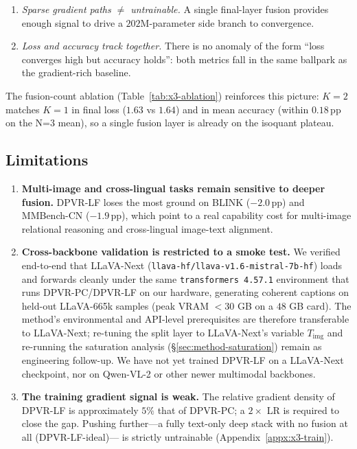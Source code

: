 \documentclass[a4paper,fleqn,review]{cas-sc}
\newcommand{\dpvrlf}{DPVR-LF}
\newcommand{\dpvrpc}{DPVR-PC}
\newcommand{\dpvrlfideal}{DPVR-LF-ideal}
\begin{document}
\begin{enumerate}
\item \emph{Sparse gradient paths $\neq$ untrainable.} A single
final-layer fusion provides enough signal to drive a $202$M-parameter
side branch to convergence.
\item \emph{Loss and accuracy track together.} There is no anomaly
of the form ``loss converges high but accuracy holds'': both
metrics fall in the same ballpark as the gradient-rich baseline.
\end{enumerate}

The fusion-count ablation (Table~\ref{tab:x3-ablation}) reinforces
this picture: $K = 2$ matches $K = 1$ in final loss ($1.63$ vs
$1.64$) and in mean accuracy (within $0.18$\,pp on the N=3 mean),
so a single fusion layer is already on the isoquant plateau.

\subsection{Limitations}\label{sec:discuss-limit}

\begin{enumerate}
\item \textbf{Multi-image and cross-lingual tasks remain sensitive
to deeper fusion.} \dpvrlf{} loses the most ground on BLINK
($-2.0$\,pp) and MMBench-CN ($-1.9$\,pp), which point to a real
capability cost for multi-image relational reasoning and
cross-lingual image-text alignment.

\item \textbf{Cross-backbone validation is restricted to a smoke
test.} We verified end-to-end that LLaVA-Next
(\texttt{llava-hf/llava-v1.6-mistral-7b-hf}) loads and forwards
cleanly under the same \texttt{transformers 4.57.1} environment that
runs \dpvrpc{}/\dpvrlf{} on our hardware, generating coherent
captions on held-out LLaVA-665k samples (peak VRAM
$< 30$ GB on a $48$ GB card). The method's environmental and
API-level prerequisites are therefore transferable to LLaVA-Next;
re-tuning the split layer to LLaVA-Next's variable
$T_{\mathrm{img}}$ and re-running the saturation analysis
(\S\ref{sec:method-saturation}) remain as engineering follow-up. We
have not yet trained \dpvrlf{} on a LLaVA-Next checkpoint, nor on
Qwen-VL-2 or other newer multimodal backbones.

\item \textbf{The training gradient signal is weak.} The relative
gradient density of \dpvrlf{} is approximately $5\%$ that of \dpvrpc{}; a
$2\times$ LR is required to close the gap. Pushing further---a
fully text-only deep stack with no fusion at all (\dpvrlfideal{})---%
is strictly untrainable (Appendix~\ref{appx:x3-train}).
\end{enumerate}
\end{document}
